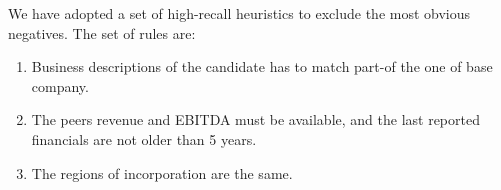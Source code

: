 \documentclass[]{article}
\begin{document}
We have adopted a set of high-recall heuristics to exclude the most obvious 
negatives. The set of rules are:

\begin{mylist}
    \begin{enumerate}
        \item Business descriptions of the candidate has to match part-of the 
        one of base company.
        \item The peers revenue and EBITDA must be available, and the last 
        reported financials are not older than 5 years.
        \item The regions of incorporation are the same.
    \end{enumerate}
\end{mylist}
\end{document}
